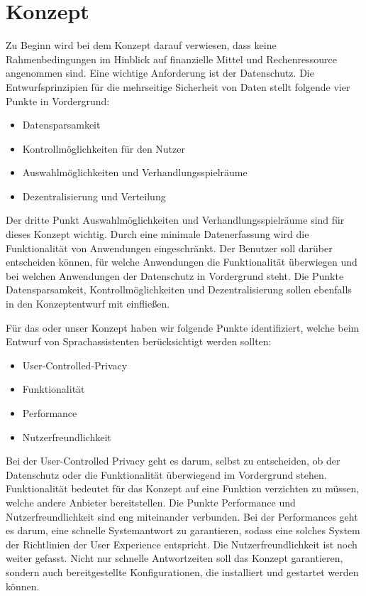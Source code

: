\section{Konzept}\label{sec:konzept}
Zu Beginn wird bei dem Konzept darauf verwiesen, dass keine Rahmenbedingungen im Hinblick auf finanzielle Mittel und Rechenressource angenommen sind.
Eine wichtige Anforderung ist der Datenschutz. Die Entwurfsprinzipien für die mehrseitige Sicherheit von Daten stellt folgende vier Punkte in Vordergrund\cite{kairannenberg}:

\begin{itemize}
\item Datensparsamkeit
\item Kontrollmöglichkeiten für den Nutzer 
\item Auswahlmöglichkeiten und Verhandlungsspielräume 
\item Dezentralisierung und Verteilung

\end{itemize}
Der dritte Punkt \glqq Auswahlmöglichkeiten und Verhandlungsspielräume\grqq{} sind für dieses Konzept wichtig. Durch eine minimale Datenerfassung wird die Funktionalität von Anwendungen eingeschränkt. Der Benutzer soll darüber entscheiden können, für welche Anwendungen die Funktionalität überwiegen und bei welchen Anwendungen der Datenschutz in Vordergrund steht. Die Punkte Datensparsamkeit, Kontrollmöglichkeiten und Dezentralisierung sollen ebenfalls in den Konzeptentwurf mit einfließen.

Für das oder unser Konzept haben wir folgende Punkte identifiziert, welche beim Entwurf von Sprachassistenten berücksichtigt werden sollten:

\begin{itemize}
\item User-Controlled-Privacy
\item Funktionalität
\item Performance
\item Nutzerfreundlichkeit	
\end{itemize}

Bei der User-Controlled Privacy geht es darum, selbst zu entscheiden, ob der Datenschutz oder die Funktionalität überwiegend im Vordergrund stehen. Funktionalität bedeutet für das Konzept auf eine Funktion verzichten zu müssen, welche andere Anbieter bereitstellen. Die Punkte Performance und Nutzerfreundlichkeit sind eng miteinander verbunden. Bei der Performances geht es darum, eine schnelle Systemantwort zu garantieren, sodass eine solches System der Richtlinien der User Experience entspricht. Die Nutzerfreundlichkeit ist noch weiter gefasst. Nicht nur schnelle Antwortzeiten soll das Konzept garantieren, sondern auch bereitgestellte Konfigurationen, die installiert und gestartet werden können. 

